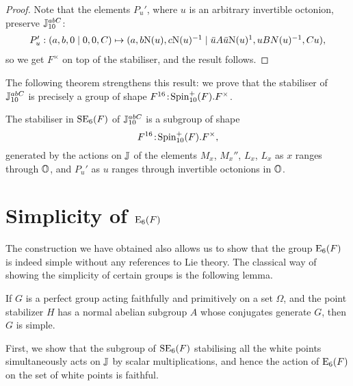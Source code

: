 \begin{proof}
	Note that the elements $P_u'$, where $u$ is an arbitrary
	invertible octonion, preserve $\mathbb{J}_{10}^{abC}$:
	\begin{equation*}
		\begin{array}{r@{\;}c@{\;}l}
			P_u': (a,b,0\mid 0,0,C) & \mapsto &
		(a,b \NN(u), c \NN(u)^{-1} \mid \ovu A \ovu \NN(u)^{1},
			u B N(u)^{-1}, C u), 
		\end{array}
	\end{equation*}
	so we get $F^{\times}$ on top of the stabiliser, 
	and the result follows.
\end{proof}

The following theorem strengthens this result:
we prove that the stabiliser of $\mathbb{J}_{10}^{abC}$ is 
precisely a group of shape $F^{16}\mathord{{\;\!{:}\;\!}}\mathrm{Spin}_{10}^+(F).F^{\times}$.

\begin{theorem}
	The stabiliser in $\mathrm{SE}_6(F)$ of 
	$\mathbb{J}_{10}^{abC}$ is a subgroup of
	shape
	\begin{equation}
		F^{16}\mathord{{\;\!{:}\;\!}}\mathrm{Spin}_{10}^+(F).F^{\times},
	\end{equation}
	generated by the actions on $\mathbb{J}$ of the elements 
	$M_x$, $M_x''$, $L_x$, $L_x$ as $x$ ranges through $\mathbb{O}$,
	and $P_u'$ as $u$ ranges through invertible octonions in 
	$\mathbb{O}$.
\end{theorem}





\section{Simplicity of $\mathord{\mathrm{E}}_6(F)$}

The construction we have obtained also allows us to show that the group $\mathord{\mathrm{E}}_6(F)$ is indeed
simple without any references to Lie theory. The classical way of showing the simplicity of 
certain groups is the following lemma.

\begin{lemma}[Iwasawa]
    If $G$ is a perfect group acting faithfully and primitively 
    on a set $\Omega$, and the point stabilizer $H$ has a normal
    abelian subgroup $A$ whose conjugates generate $G$, then
    $G$ is simple.
\end{lemma}

First, we show that the subgroup of $\mathrm{SE}_6(F)$ stabilising 
all the white points simultaneously acts on $\mathbb{J}$ by scalar multiplications, and hence
the action of $\mathrm{E}_6(F)$ on the set of white points is faithful.

